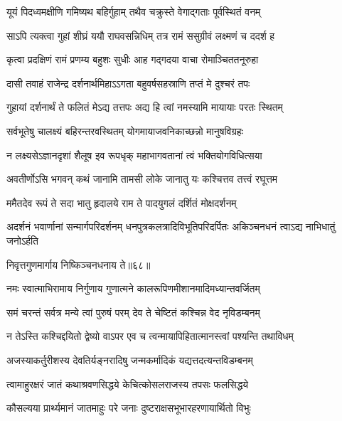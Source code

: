 


\addtocounter{shlokacount}{57}

\twolineshloka
{यूयं पिदध्वमक्षीणि गमिष्यथ बहिर्गुहाम्}
{तथैव चक्रुस्ते वेगाद्गताः पूर्वस्थितं वनम्} %

\twolineshloka
{साऽपि त्यक्त्वा गुहां शीघ्रं ययौ राघवसन्निधिम्}
{तत्र रामं ससुग्रीवं लक्ष्मणं च ददर्श ह} %

\twolineshloka
{कृत्वा प्रदक्षिणं रामं प्रणम्य बहुशः सुधीः}
{आह गद्गदया वाचा रोमाञ्चिततनूरुहा} %

\twolineshloka
{दासी तवाहं राजेन्द्र दर्शनार्थमिहाऽऽगता}
{बहुवर्षसहस्राणि तप्तं मे दुश्चरं तपः} %

\twolineshloka
{गुहायां दर्शनार्थं ते फलितं मेऽद्य तत्तपः}
{अद्य हि त्वां नमस्यामि मायायाः परतः स्थितम्} %

\twolineshloka
{सर्वभूतेषु चालक्ष्यं बहिरन्तरवस्थितम्}
{योगमायाजवनिकाच्छन्नो मानुषविग्रहः} %

\twolineshloka
{न लक्ष्यसेऽज्ञानदृशां शैलूष इव रूपधृक्}
{महाभागवतानां त्वं भक्तियोगविधित्सया} %

\twolineshloka
{अवतीर्णोऽसि भगवन् कथं जानामि तामसी}
{लोके जानातु यः कश्चित्तव तत्त्वं रघूत्तम} %

\twolineshloka
{ममैतदेव रूपं ते सदा भातु हृदालये}
{राम ते पादयुगलं दर्शितं मोक्षदर्शनम्} %

\threelineshloka
{अदर्शनं भवार्णानां सन्मार्गपरिदर्शनम्}
{धनपुत्रकलत्रादिविभूतिपरिदर्पितः}
{अकिञ्चनधनं त्वाऽद्य नाभिधातुं जनोऽर्हति} %

\onelineshloka
{निवृत्तगुणमार्गाय निष्किञ्चनधनाय ते॥६८॥} %

\twolineshloka
{नमः स्वात्माभिरामाय निर्गुणाय गुणात्मने}
{कालरूपिणमीशानमादिमध्यान्तवर्जितम्} %

\twolineshloka
{समं चरन्तं सर्वत्र मन्ये त्वां पुरुषं परम्}
{देव ते चेष्टितं कश्चिन्न वेद नृविडम्बनम्} %

\twolineshloka
{न तेऽस्ति कश्चिद्दयितो द्वेष्यो वाऽपर एव च}
{त्वन्मायापिहितात्मानस्त्वां पश्यन्ति तथाविधम्} %

\twolineshloka
{अजस्याकर्तुरीशस्य देवतिर्यङ्नरादिषु}
{जन्मकर्मादिकं यद्यत्तदत्यन्तविडम्बनम्} %

\twolineshloka
{त्वामाहुरक्षरं जातं कथाश्रवणसिद्धये}
{केचित्कोसलराजस्य तपसः फलसिद्धये} %

\twolineshloka
{कौसल्यया प्रार्थ्यमानं जातमाहुः परे जनाः}
{दुष्टराक्षसभूभारहरणायार्थितो विभुः} %


